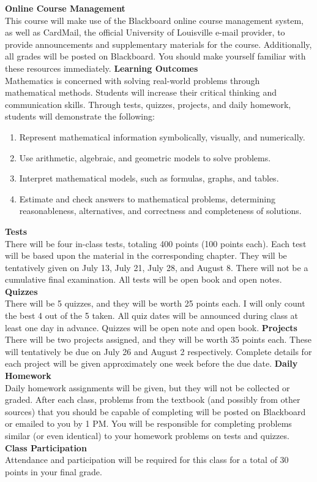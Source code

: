 \documentclass[addpoints,12pt]{exam}
\begin{document}
\noindent \textbf{Online Course Management} \\
This course will make use of the Blackboard online course management system, as well as CardMail, the official University of Louisville e-mail provider, to provide announcements and supplementary materials for the course. Additionally, all grades will be posted on Blackboard. You should make yourself familiar with these resources immediately.
\wl
\noindent \textbf{Learning Outcomes} \\
Mathematics is concerned with solving real-world problems through mathematical methods.  Students will increase their critical thinking and communication skills. Through tests, quizzes, projects, and daily homework, students will demonstrate the following:
\begin{enumerate} \itemsep10pt \parskip-6pt 
\item Represent mathematical information symbolically, visually, and numerically.
\item Use arithmetic, algebraic, and geometric models to solve problems.
\item Interpret mathematical models, such as formulas, graphs, and tables.
\item Estimate and check answers to mathematical problems, determining reasonableness, alternatives, and correctness and completeness of solutions.
\end{enumerate}
\newpage



\noindent \textbf{Tests} \\
There will be four in-class tests, totaling 400 points (100 points each). Each test will be based upon the material in the corresponding chapter. They will be tentatively given on July 13, July 21, July 28, and August 8. There will not be a cumulative final examination. All tests will be open book and open notes. 
\wl
\noindent \textbf{Quizzes} \\
There will be 5 quizzes, and they will be worth 25 points each. I will only count the best 4 out of the 5 taken. All quiz dates will be announced during class at least one day in advance. Quizzes will be open note and open book.
\wl
\noindent \textbf{Projects} \\
There will be two projects assigned, and they will be worth 35 points each. These will tentatively be due on July 26 and August 2 respectively. Complete details for each project will be given approximately one week before the due date.
\wl
\noindent \textbf{Daily Homework} \\
Daily homework assignments will be given, but they will not be collected or graded. After each class, problems from the textbook (and possibly from other sources) that you should be capable of completing will be posted on Blackboard or emailed to you by 1 PM. You will be responsible for completing problems similar (or even identical) to your homework problems on tests and quizzes.
\wl
\noindent \textbf{Class Participation} \\
Attendance and participation will be required for this class for a total of 30 points in your final grade. 
\end{document}
